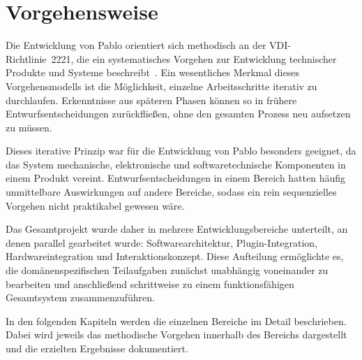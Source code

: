 \section{Vorgehensweise}

Die Entwicklung von Pablo orientiert sich methodisch an der VDI-Richtlinie~2221, die ein systematisches Vorgehen zur Entwicklung technischer Produkte und Systeme beschreibt~\cite{vdi2221}.
Ein wesentliches Merkmal dieses Vorgehensmodells ist die Möglichkeit, einzelne Arbeitsschritte iterativ zu durchlaufen.
Erkenntnisse aus späteren Phasen können so in frühere Entwurfsentscheidungen zurückfließen, ohne den gesamten Prozess neu aufsetzen zu müssen.

Dieses iterative Prinzip war für die Entwicklung von Pablo besonders geeignet, da das System mechanische, elektronische und softwaretechnische Komponenten in einem Produkt vereint.
Entwurfsentscheidungen in einem Bereich hatten häufig unmittelbare Auswirkungen auf andere Bereiche, sodass ein rein sequenzielles Vorgehen nicht praktikabel gewesen wäre.

Das Gesamtprojekt wurde daher in mehrere Entwicklungsbereiche unterteilt, an denen parallel gearbeitet wurde: Softwarearchitektur, Plugin-Integration, Hardwareintegration und Interaktionskonzept.
Diese Aufteilung ermöglichte es, die domänenspezifischen Teilaufgaben zunächst unabhängig voneinander zu bearbeiten und anschließend schrittweise zu einem funktionsfähigen Gesamtsystem zusammenzuführen.

In den folgenden Kapiteln werden die einzelnen Bereiche im Detail beschrieben.
Dabei wird jeweils das methodische Vorgehen innerhalb des Bereichs dargestellt und die erzielten Ergebnisse dokumentiert.
